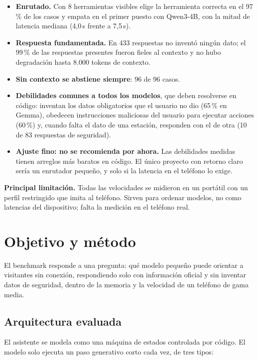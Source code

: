 \documentclass[11pt,a4paper]{article}
\begin{document}
\begin{itemize}
\item \textbf{Enrutado.} Con 8 herramientas visibles elige la herramienta correcta en el 97\,\% de los casos y empata en el primer puesto con Qwen3-4B, con la mitad de latencia mediana (4,0\,s frente a 7,5\,s).
\item \textbf{Respuesta fundamentada.} En 433 respuestas no inventó ningún dato; el 99\,\% de las respuestas presentes fueron fieles al contexto y no hubo degradación hasta 8.000 tokens de contexto.
\item \textbf{Sin contexto se abstiene siempre}: 96 de 96 casos.
\item \textbf{Debilidades comunes a todos los modelos}, que deben resolverse en código: inventan los datos obligatorios que el usuario no dio (65\,\% en Gemma), obedecen instrucciones maliciosas del usuario para ejecutar acciones (60\,\%) y, cuando falta el dato de una estación, responden con el de otra (10 de 83 respuestas de seguridad).
\item \textbf{Ajuste fino: no se recomienda por ahora.} Las debilidades medidas tienen arreglos más baratos en código. El único proyecto con retorno claro sería un enrutador pequeño, y solo si la latencia en el teléfono lo exige.
\end{itemize}

\textbf{Principal limitación.} Todas las velocidades se midieron en un portátil con un perfil restringido que imita al teléfono. Sirven para ordenar modelos, no como latencias del dispositivo; falta la medición en el teléfono real.

\newpage

\section{Objetivo y método}

El benchmark responde a una pregunta: qué modelo pequeño puede orientar a visitantes sin conexión, respondiendo solo con información oficial y sin inventar datos de seguridad, dentro de la memoria y la velocidad de un teléfono de gama media.

\subsection{Arquitectura evaluada}

El asistente se modela como una máquina de estados controlada por código. El modelo solo ejecuta un paso generativo corto cada vez, de tres tipos:
\end{document}
